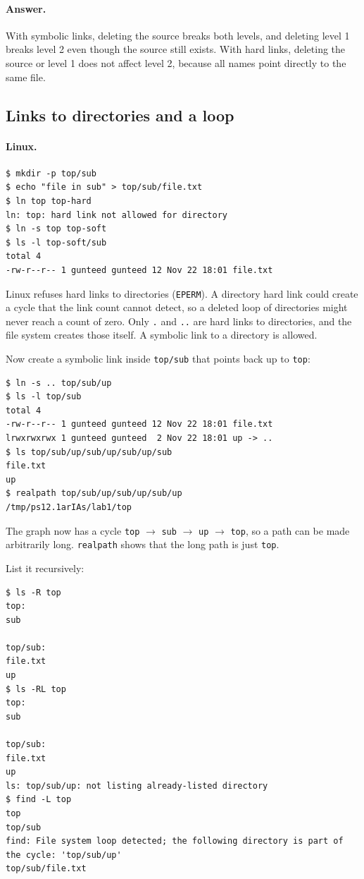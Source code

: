\documentclass[11pt,a4paper]{article}
\newcommand{\code}[1]{\texttt{#1}}
\begin{document}
\paragraph{Answer.} With symbolic links, deleting the source breaks both
levels, and deleting level 1 breaks level 2 even though the source still
exists. With hard links, deleting the source or level 1 does not affect
level 2, because all names point directly to the same file.

\subsection{Links to directories and a loop}

\paragraph{Linux.}\mbox{}

\begin{lstlisting}
$ mkdir -p top/sub
$ echo "file in sub" > top/sub/file.txt
$ ln top top-hard
ln: top: hard link not allowed for directory
$ ln -s top top-soft
$ ls -l top-soft/sub
total 4
-rw-r--r-- 1 gunteed gunteed 12 Nov 22 18:01 file.txt
\end{lstlisting}

Linux refuses hard links to directories (\code{EPERM}). A directory hard link
could create a cycle that the link count cannot detect, so a deleted loop of
directories might never reach a count of zero. Only \code{.} and \code{..} are
hard links to directories, and the file system creates those itself. A
symbolic link to a directory is allowed.

Now create a symbolic link inside \code{top/sub} that points back up to
\code{top}:

\begin{lstlisting}
$ ln -s .. top/sub/up
$ ls -l top/sub
total 4
-rw-r--r-- 1 gunteed gunteed 12 Nov 22 18:01 file.txt
lrwxrwxrwx 1 gunteed gunteed  2 Nov 22 18:01 up -> ..
$ ls top/sub/up/sub/up/sub/up/sub
file.txt
up
$ realpath top/sub/up/sub/up/sub/up
/tmp/ps12.1arIAs/lab1/top
\end{lstlisting}

The graph now has a cycle \code{top} $\rightarrow$ \code{sub} $\rightarrow$
\code{up} $\rightarrow$ \code{top}, so a path can be made arbitrarily long.
\code{realpath} shows that the long path is just \code{top}.

List it recursively:

\begin{lstlisting}
$ ls -R top
top:
sub

top/sub:
file.txt
up
$ ls -RL top
top:
sub

top/sub:
file.txt
up
ls: top/sub/up: not listing already-listed directory
$ find -L top
top
top/sub
find: File system loop detected; the following directory is part of the cycle: 'top/sub/up'
top/sub/file.txt
\end{lstlisting}
\end{document}
